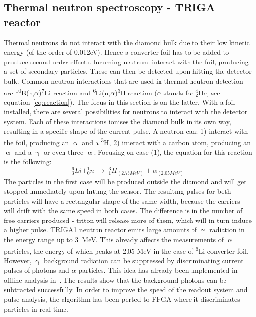 \documentclass[12pt]{packages/mytustyle}  %
\begin{document}
\subsection{Thermal neutron spectroscopy - TRIGA reactor}

Thermal neutrons do not interact with the diamond bulk due to their low kinetic energy (of the order of 0.012eV). Hence a converter foil has to be added to produce second order effects. Incoming neutrons interact with the foil, producing a set of secondary particles. These can then be detected upon hitting the detector bulk. Common neutron interactions that are used in thermal neutron detection are \textsuperscript{10}B(n,$\alpha$)\textsuperscript{7}Li reaction and \textsuperscript{6}Li(n,$\alpha$)\textsuperscript{3}H reaction ($\alpha$ stands for $^4_2$He, see equation~\ref{eq:reaction}). The focus in this section is on the latter. With a foil installed, there are several possibilities for neutrons to interact with the detector system. Each of these interactions ionises the diamond bulk in its own way, resulting in a specific shape of the current pulse. A neutron can: 1) interact with the foil, producing an $\upalpha$ and a \textsuperscript{3}H, 2) interact with a carbon atom, producing an $\upalpha$ and a $\upgamma$ or even three $\upalpha$. Focusing on case (1), the equation for this reaction is the following:
\begin{equation}
\label{eq:reaction}
   ^6_3Li   +   ^1_0n \;\rightarrow\; ^3_1H_{(2.73 MeV)} + \alpha_{(2.05 MeV)}
\end{equation}
The particles in the first case will be produced outside the diamond and will get stopped immediately upon hitting the sensor. The resulting pulses for both particles will have a rectangular shape of the same width, because the carriers will drift with the same speed in both cases. The difference is in the number of free carriers produced - triton will release more of them, which will in turn induce a higher pulse.
TRIGA1 neutron reactor emits large amounts of $\upgamma$ radiation in the energy range up to 3~MeV. This already affects the measurements of $\upalpha$ particles, the energy of which peaks at 2.05 MeV in the case of \textsuperscript{6}Li converter foil. However, $\upgamma$ background radiation can be suppressed by discriminating current pulses of photons and $\alpha$ particles. This idea has already been implemented in offline analysis in~\cite{}. The results show that the background photons can be subtracted successfully. In order to improve the speed of the readout system and pulse analysis, the algorithm has been ported to FPGA where it discriminates particles in real time. 
\end{document}
